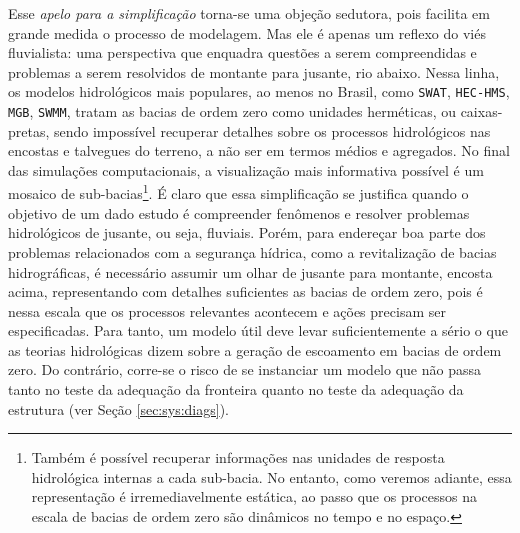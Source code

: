 \documentclass[./main.tex]{subfiles}
\begin{document}
\par  Esse \textit{apelo para a simplificação} torna-se uma objeção sedutora, pois facilita em grande medida o processo de modelagem. Mas ele é apenas um reflexo do viés fluvialista: uma perspectiva que enquadra questões a serem compreendidas e problemas a serem resolvidos de montante para jusante, rio abaixo. Nessa linha, os modelos hidrológicos mais populares, ao menos no Brasil, como \texttt{SWAT}, \texttt{HEC-HMS}, \texttt{MGB}, \texttt{SWMM}, tratam as bacias de ordem zero como unidades herméticas, ou caixas-pretas, sendo impossível recuperar detalhes sobre os processos hidrológicos nas encostas e talvegues do terreno, a não ser em termos médios e agregados. No final das simulações computacionais, a visualização mais informativa possível é um mosaico de sub-bacias\footnote{Também é possível recuperar informações nas unidades de resposta hidrológica internas a cada sub-bacia. No entanto, como veremos adiante, essa representação é irremediavelmente estática, ao passo que os processos na escala de bacias de ordem zero são dinâmicos no tempo e no espaço.}. É claro que essa simplificação se justifica quando o objetivo de um dado estudo é compreender fenômenos e resolver problemas hidrológicos de jusante, ou seja, fluviais. Porém, para endereçar boa parte dos problemas relacionados com a segurança hídrica, como a revitalização de bacias hidrográficas, é necessário assumir um olhar de jusante para montante, encosta acima, representando com detalhes suficientes as bacias de ordem zero, pois é nessa escala que os processos relevantes acontecem e ações precisam ser especificadas. Para tanto, um modelo útil deve levar suficientemente a sério o que as teorias hidrológicas dizem sobre a geração de escoamento em bacias de ordem zero. Do contrário, corre-se o risco de se instanciar um modelo que não passa tanto no teste da adequação da fronteira quanto no teste da adequação da estrutura (ver Seção \ref{sec:sys:diags}). 
\end{document}
